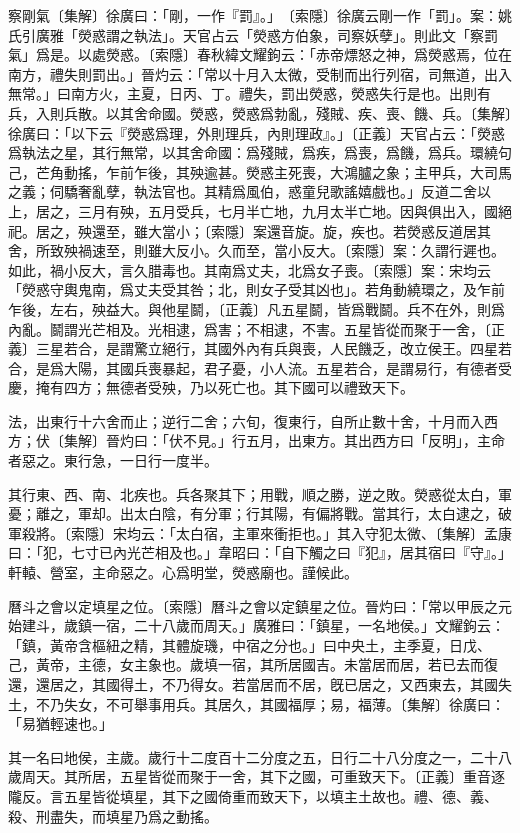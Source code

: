察剛氣〔集解〕徐廣曰：「剛，一作『罰』。」　〔索隱〕徐廣云剛一作「罰」。案：姚氏引廣雅「熒惑謂之執法」。天官占云「熒惑方伯象，司察妖孽」。則此文「察罰氣」爲是。以處熒惑。〔索隱〕春秋緯文耀鉤云：「赤帝熛怒之神，爲熒惑焉，位在南方，禮失則罰出。」晉灼云：「常以十月入太微，受制而出行列宿，司無道，出入無常。」曰南方火，主夏，日丙、丁。禮失，罰出熒惑，熒惑失行是也。出則有兵，入則兵散。以其舍命國。熒惑，熒惑爲勃亂，殘賊、疾、喪、饑、兵。〔集解〕徐廣曰：「以下云『熒惑爲理，外則理兵，內則理政』。」〔正義〕天官占云：「熒惑爲執法之星，其行無常，以其舍命國：爲殘賊，爲疾，爲喪，爲饑，爲兵。環繞句己，芒角動搖，乍前乍後，其殃逾甚。熒惑主死喪，大鴻臚之象；主甲兵，大司馬之義；伺驕奢亂孽，執法官也。其精爲風伯，惑童兒歌謠嬉戲也。」反道二舍以上，居之，三月有殃，五月受兵，七月半亡地，九月太半亡地。因與俱出入，國絕祀。居之，殃還至，雖大當小；〔索隱〕案還音旋。旋，疾也。若熒惑反道居其舍，所致殃禍速至，則雖大反小。久而至，當小反大。〔索隱〕案：久謂行遲也。如此，禍小反大，言久腊毒也。其南爲丈夫，北爲女子喪。〔索隱〕案：宋均云「熒惑守輿鬼南，爲丈夫受其咎；北，則女子受其凶也」。若角動繞環之，及乍前乍後，左右，殃益大。與他星鬬，〔正義〕凡五星鬬，皆爲戰鬬。兵不在外，則爲內亂。鬬謂光芒相及。光相逮，爲害；不相逮，不害。五星皆從而聚于一舍，〔正義〕三星若合，是謂驚立絕行，其國外內有兵與喪，人民饑乏，改立侯王。四星若合，是爲大陽，其國兵喪暴起，君子憂，小人流。五星若合，是謂易行，有德者受慶，掩有四方；無德者受殃，乃以死亡也。其下國可以禮致天下。

法，出東行十六舍而止；逆行二舍；六旬，復東行，自所止數十舍，十月而入西方；伏〔集解〕晉灼曰：「伏不見。」行五月，出東方。其出西方曰「反明」，主命者惡之。東行急，一日行一度半。

其行東、西、南、北疾也。兵各聚其下；用戰，順之勝，逆之敗。熒惑從太白，軍憂；離之，軍却。出太白陰，有分軍；行其陽，有偏將戰。當其行，太白逮之，破軍殺將。〔索隱〕宋均云：「太白宿，主軍來衝拒也。」其入守犯太微、〔集解〕孟康曰：「犯，七寸已內光芒相及也。」韋昭曰：「自下觸之曰『犯』，居其宿曰『守』。」軒轅、營室，主命惡之。心爲明堂，熒惑廟也。謹候此。

曆斗之會以定填星之位。〔索隱〕曆斗之會以定鎮星之位。晉灼曰：「常以甲辰之元始建斗，歲鎮一宿，二十八歲而周天。」廣雅曰：「鎮星，一名地侯。」文耀鉤云：「鎮，黃帝含樞紐之精，其體旋璣，中宿之分也。」曰中央土，主季夏，日戊、己，黃帝，主德，女主象也。歲填一宿，其所居國吉。未當居而居，若已去而復還，還居之，其國得土，不乃得女。若當居而不居，旣已居之，又西東去，其國失土，不乃失女，不可舉事用兵。其居久，其國福厚；易，福薄。〔集解〕徐廣曰：「易猶輕速也。」

其一名曰地侯，主歲。歲行十二度百十二分度之五，日行二十八分度之一，二十八歲周天。其所居，五星皆從而聚于一舍，其下之國，可重致天下。〔正義〕重音逐隴反。言五星皆從填星，其下之國倚重而致天下，以填主土故也。禮、德、義、殺、刑盡失，而填星乃爲之動搖。

